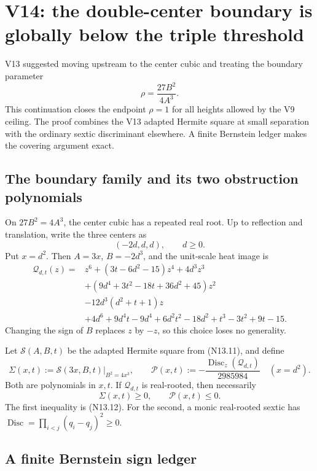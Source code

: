 \documentclass[11pt]{article}
\theoremstyle{definition}
\theoremstyle{remark}
\begin{document}
\section{V14: the double-center boundary is globally below the triple threshold}

V13 suggested moving upstream to the center cubic and treating the boundary
parameter
\[
 \rho=\frac{27B^2}{4A^3}.
\]
This continuation closes the endpoint \(\rho=1\) for all heights allowed by
the V9 ceiling.  The proof combines the V13 adapted Hermite square at small
separation with the ordinary sextic discriminant elsewhere.  A finite
Bernstein ledger makes the covering argument exact.

\subsection{The boundary family and its two obstruction polynomials}

On \(27B^2=4A^3\), the center cubic has a repeated real root.  Up to
reflection and translation, write the three centers as
\[
 (-2d,d,d),\qquad d\geq0.
 \tag{N14.1}
\]
Put \(x=d^2\).  Then \(A=3x\), \(B=-2d^3\), and the unit-scale heat image is
\[
\begin{aligned}
 \mathcal Q_{d,t}(z)={}&z^6+(3t-6d^2-15)z^4+4d^3z^3\\
 &+(9d^4+3t^2-18t+36d^2+45)z^2\\
 &-12d^3(d^2+t+1)z\\
 &+4d^6+9d^4t-9d^4+6d^2t^2-18d^2
   +t^3-3t^2+9t-15.
\end{aligned}
\tag{N14.2}
\]
Changing the sign of \(B\) replaces \(z\) by \(-z\), so this choice loses no
generality.

Let \(\mathcal S(A,B,t)\) be the adapted Hermite square from
\textup{(N13.11)}, and define
\[
 \Sigma(x,t):=\mathcal S(3x,B,t)\big|_{B^2=4x^3},
 \qquad
 \mathcal P(x,t):=
 -\frac{\operatorname{Disc}_z(\mathcal Q_{d,t})}{2985984}
 \quad(x=d^2).
 \tag{N14.3}
\]
Both are polynomials in \(x,t\).  If \(\mathcal Q_{d,t}\) is real-rooted,
then necessarily
\[
 \Sigma(x,t)\geq0,\qquad \mathcal P(x,t)\leq0.
 \tag{N14.4}
\]
The first inequality is \textup{(N13.12)}.  For the second, a monic
real-rooted sextic has
\(\operatorname{Disc}=\prod_{i<j}(q_i-q_j)^2\geq0\).

\subsection{A finite Bernstein sign ledger}
\end{document}
